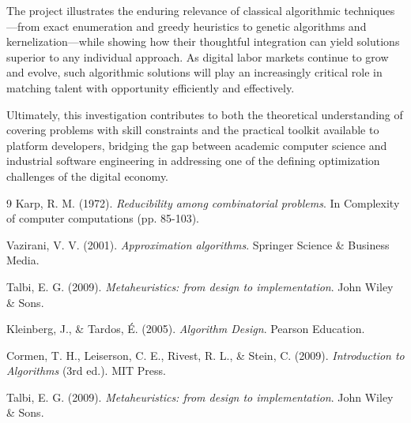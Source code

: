 \documentclass[12pt,a4paper]{article}
\begin{document}
The project illustrates the enduring relevance of classical algorithmic techniques—from exact enumeration and greedy heuristics to genetic algorithms and kernelization—while showing how their thoughtful integration can yield solutions superior to any individual approach. As digital labor markets continue to grow and evolve, such algorithmic solutions will play an increasingly critical role in matching talent with opportunity efficiently and effectively.

Ultimately, this investigation contributes to both the theoretical understanding of covering problems with skill constraints and the practical toolkit available to platform developers, bridging the gap between academic computer science and industrial software engineering in addressing one of the defining optimization challenges of the digital economy.
	
	
\begin{thebibliography}{9}
	Karp, R. M. (1972). 
	\textit{Reducibility among combinatorial problems}. 
	In Complexity of computer computations (pp. 85-103).
	
	Vazirani, V. V. (2001). 
	\textit{Approximation algorithms}. 
	Springer Science \& Business Media.
	
	Talbi, E. G. (2009). 
	\textit{Metaheuristics: from design to implementation}. 
	John Wiley \& Sons.
	
	Kleinberg, J., \& Tardos, \'{E}. (2005). 
	\textit{Algorithm Design}. 
	Pearson Education.
	
	Cormen, T. H., Leiserson, C. E., Rivest, R. L., \& Stein, C. (2009). 
	\textit{Introduction to Algorithms} (3rd ed.). 
	MIT Press.
	
	Talbi, E. G. (2009). 
	\textit{Metaheuristics: from design to implementation}. 
	John Wiley \& Sons.
\end{thebibliography}
	
	
\end{document}
